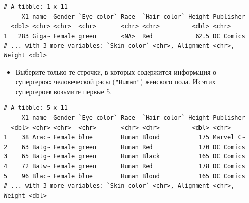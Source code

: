 \documentclass[
]{book}
\newenvironment{Shaded}{\begin{snugshade}}{\end{snugshade}}
\newcommand{\DecValTok}[1]{\textcolor[rgb]{0.00,0.00,0.81}{#1}}
\newcommand{\KeywordTok}[1]{\textcolor[rgb]{0.13,0.29,0.53}{\textbf{#1}}}
\newcommand{\NormalTok}[1]{#1}
\newcommand{\OperatorTok}[1]{\textcolor[rgb]{0.81,0.36,0.00}{\textbf{#1}}}
\newcommand{\StringTok}[1]{\textcolor[rgb]{0.31,0.60,0.02}{#1}}
\providecommand{\tightlist}{%
  \setlength{\itemsep}{0pt}\setlength{\parskip}{0pt}}
\begin{document}
\begin{Shaded}
\end{Shaded}

\begin{verbatim}
# A tibble: 1 x 11
     X1 name  Gender `Eye color` Race  `Hair color` Height Publisher
  <dbl> <chr> <chr>  <chr>       <chr> <chr>         <dbl> <chr>    
1   283 Giga~ Female green       <NA>  Red            62.5 DC Comics
# ... with 3 more variables: `Skin color` <chr>, Alignment <chr>, Weight <dbl>
\end{verbatim}

\begin{itemize}
\tightlist
\item
  Выберите только те строчки, в которых содержится информация о супергероях человеческой расы (\texttt{"Human"}) женского пола. Из этих супергероев возьмите первые 5.
\end{itemize}

\begin{Shaded}
\end{Shaded}

\begin{verbatim}
# A tibble: 5 x 11
     X1 name  Gender `Eye color` Race  `Hair color` Height Publisher
  <dbl> <chr> <chr>  <chr>       <chr> <chr>         <dbl> <chr>    
1    38 Arac~ Female blue        Human Blond           175 Marvel C~
2    63 Batg~ Female green       Human Red             170 DC Comics
3    65 Batg~ Female green       Human Black           165 DC Comics
4    72 Batw~ Female green       Human Red             178 DC Comics
5    96 Blac~ Female blue        Human Blond           165 DC Comics
# ... with 3 more variables: `Skin color` <chr>, Alignment <chr>, Weight <dbl>
\end{verbatim}
\end{document}
